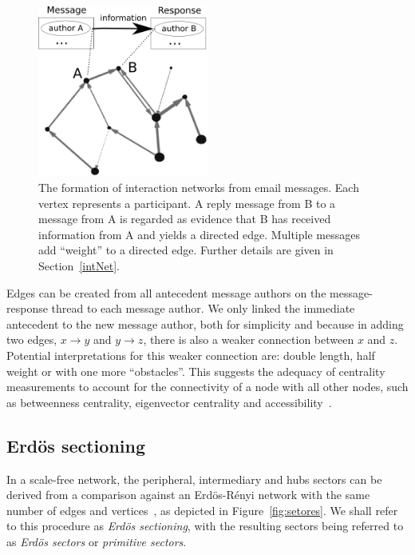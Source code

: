 \documentclass[%
	aip,
	jmp,%
	amsmath,amssymb,
	reprint,%
]{revtex4-1}
\begin{document}
\begin{figure}[!h]
	\centering
	\includegraphics[width=0.5\textwidth]{figs/criaRede__}
	\caption{The formation of interaction networks from email messages. Each vertex represents a participant. A reply message from B to a message from A is regarded as evidence that B has received information from A and yields a directed edge. Multiple messages add ``weight'' to a directed edge. Further details are given in Section~\ref{intNet}.}
	\label{formationNetwork}
\end{figure}

Edges can be created from all antecedent message authors on the message-response thread to each message author.
We only linked the immediate antecedent to the new message author, both for simplicity and because in adding two edges, $x\rightarrow y$ and $y\rightarrow z$, there is also a weaker connection between $x$ and $z$. Potential interpretations for this weaker connection are: double length, half weight or with one more ``obstacles''. This suggests the adequacy of centrality measurements to account for the connectivity of a node with all other nodes, such as betweenness centrality, eigenvector centrality and accessibility~\cite{luMeasures,access}.

\subsection{Erd\"os sectioning}\label{sectioning}
In a scale-free network, the peripheral, intermediary and hubs sectors can be derived from a comparison against an Erd\"os-R\'enyi network with the same number of edges and vertices~\cite{3setores}, as depicted in Figure~\ref{fig:setores}. We shall refer to this procedure as \emph{Erd\"os sectioning}, with the resulting sectors being referred to as \emph{Erd\"os sectors} or \emph{primitive sectors}.
\end{document}
